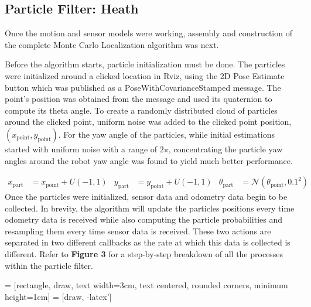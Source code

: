 \documentclass{article}
\begin{document}
\subsection{Particle Filter: Heath}
Once the motion and sensor models were working, assembly and construction of the complete Monte Carlo Localization algorithm was next.  \par
Before the algorithm starts, particle initialization must be done. The particles were initialized around a clicked location in Rviz, using the 2D Pose Estimate button which was published as a PoseWithCovarianceStamped message. The point's position was obtained from the message and used its quaternion to compute its theta angle. To create a randomly distributed cloud of particles around the clicked point, uniform noise was added to the clicked point position, $(x_{\text{point}}, y_{\text{point}})$. For the yaw angle of the particles, while initial estimations started with uniform noise with a range of $2\pi$, concentrating the particle yaw angles around the robot yaw angle was found to yield much better performance. \par
\begin{align*}
x_{\text{part}} &= x_{\text{point}} + U(-1, 1) &
y_{\text{part}} &= y_{\text{point}} + U(-1, 1) &
\theta_{\text{part}} &= \mathcal{N}(\theta_{\text{point}}, 0.1^{2})
\end{align*}
Once the particles were initialized, sensor data and odometry data begin to be collected. In brevity, the algorithm will update the particles positions every time odometry data is received while also computing the particle probabilities and resampling them every time sensor data is received. These two actions are separated in two different callbacks as the rate at which this data is collected is different. Refer to \textbf{Figure 3} for a step-by-step breakdown of all the processes within the particle filter.\par

 = [rectangle, draw, text width=3cm, text centered, rounded corners, minimum height=1cm]
 = [draw, -latex']
\end{document}
